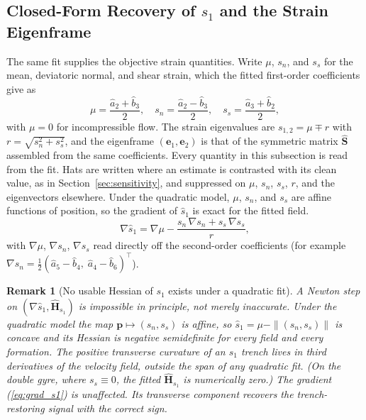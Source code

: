 \documentclass[lettersize,journal]{IEEEtran}
\newtheorem{remark}{Remark}
\begin{document}
\subsection{Closed-Form Recovery of $s_1$ and the Strain Eigenframe}
\label{sec:s1_estimation}

The same fit supplies the objective strain quantities. Write $\mu$,
$s_n$, and $s_s$ for the
mean, deviatoric normal, and shear strain, which the fitted first-order
coefficients give as
\begin{equation}
    \mu = \frac{\hat{a}_2 + \hat{b}_3}{2}, \quad
    s_n = \frac{\hat{a}_2 - \hat{b}_3}{2}, \quad
    s_s = \frac{\hat{a}_3 + \hat{b}_2}{2},
    \label{eq:strain_parts}
\end{equation}
with $\mu = 0$ for incompressible flow. The strain eigenvalues are
$s_{1,2} = \mu \mp r$ with $r = \sqrt{s_n^2 + s_s^2}$, and the
eigenframe $(\mathbf{e}_1, \mathbf{e}_2)$ is that of the symmetric
matrix $\hat{\mathbf{S}}$ assembled from the same coefficients. Every
quantity in this subsection is read from the fit. Hats are written where
an estimate is contrasted with its clean value, as in
Section~\ref{sec:sensitivity}, and suppressed on $\mu$, $s_n$, $s_s$,
$r$, and the eigenvectors elsewhere. Under
the quadratic model, $\mu$, $s_n$, and $s_s$ are affine functions of
position, so the gradient of $\hat{s}_1$ is exact for the fitted field.
\begin{equation}
    \nabla \hat{s}_1 = \nabla\mu
    - \frac{s_n\,\nabla s_n + s_s\,\nabla s_s}{r},
    \label{eq:grad_s1}
\end{equation}
with $\nabla\mu$, $\nabla s_n$, $\nabla s_s$ read directly off the
second-order coefficients (for example $\nabla s_n = \tfrac{1}{2}
(\hat{a}_5 - \hat{b}_4,\; \hat{a}_4 - \hat{b}_6)^\top$).



\begin{remark}[No usable Hessian of $s_1$ exists under a quadratic fit]
\label{rem:s1hess}
A Newton step on $(\nabla \hat{s}_1,
\hat{\mathbf{H}}_{s_1})$ is impossible in principle, not merely
inaccurate. Under the quadratic model the map $\mathbf{p} \mapsto (s_n,
s_s)$ is affine, so $\hat{s}_1 = \mu - \|(s_n, s_s)\|$ is concave and its
Hessian is negative semidefinite \emph{for every field and every
formation}. The positive transverse curvature of an $s_1$ trench lives
in third derivatives of the velocity field, outside the span of any
quadratic fit. (On the double gyre, where $s_s \equiv 0$, the fitted
$\hat{\mathbf{H}}_{s_1}$ is numerically zero.) The gradient
(\ref{eq:grad_s1}) is unaffected. Its transverse component recovers the
trench-restoring signal with the correct sign.
\end{remark}
\end{document}

